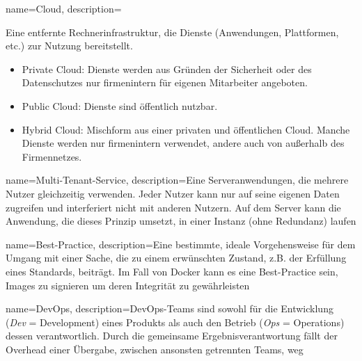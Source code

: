 



{%
  name={Cloud},
  description={Eine entfernte Rechnerinfrastruktur, die Dienste (Anwendungen, Plattformen, etc.) zur Nutzung bereitstellt.
    \begin{itemize}
      \item Private Cloud: Dienste werden aus Gründen der Sicherheit oder des Datenschutzes nur firmenintern für eigenen Mitarbeiter angeboten.
      \item Public Cloud: Dienste sind öffentlich nutzbar.
      \item Hybrid Cloud: Mischform aus einer privaten und öffentlichen Cloud. Manche Dienste werden nur firmenintern verwendet, andere auch von außerhalb des Firmennetzes.
    \end{itemize}\cite{cloud}
  }
}

{%
  name={Multi-Tenant-Service},
  description={Eine Serveranwendungen, die mehrere Nutzer gleichzeitig verwenden. Jeder Nutzer kann nur auf seine eigenen Daten zugreifen und interferiert nicht mit anderen Nutzern. Auf dem Server kann die Anwendung, die dieses Prinzip umsetzt, in einer Instanz (ohne Redundanz) laufen \cite{multitenant}}
}

{%
  name={Best-Practice},
  description={Eine bestimmte, ideale Vorgehensweise für dem Umgang mit einer Sache, die zu einem erwünschten Zustand, z.B. der Erfüllung eines Standards, beiträgt. Im Fall von Docker kann es eine Best-Practice sein, Images zu signieren um deren Integrität zu gewährleisten}
}

{%
  name={DevOps},
  description={DevOps-Teams sind sowohl für die Entwicklung (\emph{Dev} = Development) eines Produkts als auch den Betrieb (\emph{Ops} = Operations) dessen verantwortlich. Durch die gemeinsame Ergebnisverantwortung fällt der Overhead einer Übergabe, zwischen ansonsten getrennten Teams, weg \cite{devops}}
}
